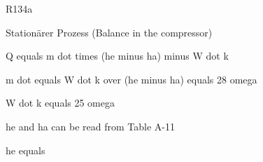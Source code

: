 R134a

Stationärer Prozess (Balance in the compressor)

Q equals m dot times (he minus ha) minus W dot k

m dot equals W dot k over (he minus ha) equals 28 omega

W dot k equals 25 omega

he and ha can be read from Table A-11

he equals